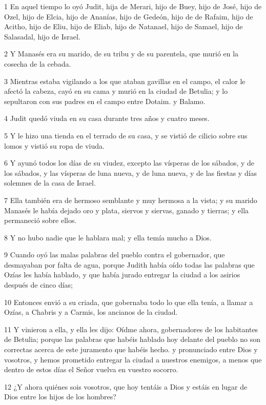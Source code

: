 \par 1 En aquel tiempo lo oyó Judit, hija de Merari, hijo de Buey, hijo de José, hijo de Ozel, hijo de Elcia, hijo de Ananías, hijo de Gedeón, hijo de de Rafaim, hijo de Acitho, hijo de Eliu, hijo de Eliab, hijo de Natanael, hijo de Samael, hijo de Salasadal, hijo de Israel.
\par 2 Y Manasés era su marido, de su tribu y de su parentela, que murió en la cosecha de la cebada.
\par 3 Mientras estaba vigilando a los que ataban gavillas en el campo, el calor le afectó la cabeza, cayó en su cama y murió en la ciudad de Betulia; y lo sepultaron con sus padres en el campo entre Dotaim. y Balamo.
\par 4 Judit quedó viuda en su casa durante tres años y cuatro meses.
\par 5 Y le hizo una tienda en el terrado de su casa, y se vistió de cilicio sobre sus lomos y vistió su ropa de viuda.
\par 6 Y ayunó todos los días de su viudez, excepto las vísperas de los sábados, y de los sábados, y las vísperas de luna nueva, y de luna nueva, y de las fiestas y días solemnes de la casa de Israel.
\par 7 Ella también era de hermoso semblante y muy hermosa a la vista; y su marido Manasés le había dejado oro y plata, siervos y siervas, ganado y tierras; y ella permaneció sobre ellos.
\par 8 Y no hubo nadie que le hablara mal; y ella temía mucho a Dios.
\par 9 Cuando oyó las malas palabras del pueblo contra el gobernador, que desmayaban por falta de agua, porque Judith había oído todas las palabras que Ozías les había hablado, y que había jurado entregar la ciudad a los asirios después de cinco días;
\par 10 Entonces envió a su criada, que gobernaba todo lo que ella tenía, a llamar a Ozías, a Chabris y a Carmis, los ancianos de la ciudad.
\par 11 Y vinieron a ella, y ella les dijo: Oídme ahora, gobernadores de los habitantes de Betulia; porque las palabras que habéis hablado hoy delante del pueblo no son correctas acerca de este juramento que habéis hecho. y pronunciado entre Dios y vosotros, y hemos prometido entregar la ciudad a nuestros enemigos, a menos que dentro de estos días el Señor vuelva en vuestro socorro.
\par 12 ¿Y ahora quiénes sois vosotros, que hoy tentáis a Dios y estáis en lugar de Dios entre los hijos de los hombres?
